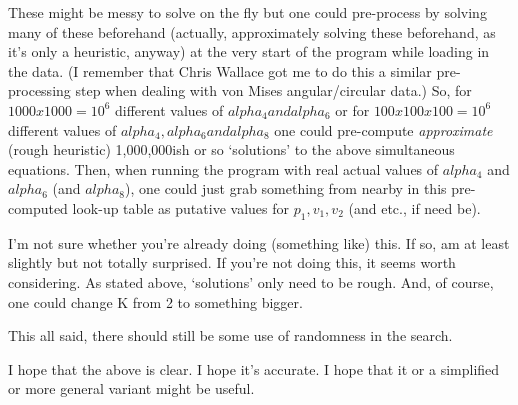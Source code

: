\documentclass{elsarticle}
\begin{document}
These might be messy to solve on the fly    but
one could pre-process by solving many of these beforehand
(actually, approximately solving these beforehand, as it's only
a heuristic, anyway) at the very start of the program while
loading in the data.
(I remember that Chris Wallace got me to do this a similar
pre-processing step when dealing with von Mises angular/circular data.)
So, for $1000 x 1000 = 10^6$ different values of $alpha_4 and alpha_6$
or for $100 x 100 x 100 = 10^6$ different values of $alpha_4, alpha_6 and alpha_8$
one could pre-compute {\em approximate} (rough heuristic)
1,000,000ish or so `solutions' to the above simultaneous equations.
Then, when running the program with real actual values of $alpha_4$ and $alpha_6$ (and $alpha_8$),
one could just grab something from nearby in this pre-computed look-up table
as putative values for $p_1, v_1, v_2$ (and etc., if need be).

I'm not sure whether you're already doing (something like) this.
If so, am at least slightly but not totally surprised.
If you're not doing this, it seems worth considering.
As stated above, `solutions' only need to be rough.
And, of course, one could change K from 2 to something bigger.

This all said, there should still be some use of randomness in the search.

I hope that the above is clear.
I hope it's accurate.
I hope that it or a simplified or more general variant might be useful.

\begin{thebibliography}{}



\end{thebibliography}
\end{document}
